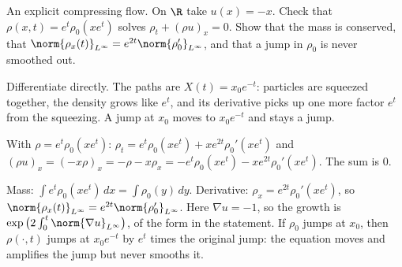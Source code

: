 \begin{exercise}
  An explicit compressing flow. On $\R$ take $u(x) = -x$. Check that $\rho(x,t) = e^t\rho_0(xe^t)$ solves $\rho_t + (\rho u)_x = 0$. Show that the mass is conserved, that $\norm{\rho_x(t)}_{L^\infty} = e^{2t}\norm{\rho_0'}_{L^\infty}$, and that a jump in $\rho_0$ is never smoothed out.
  \begin{hint}
    Differentiate directly. The paths are $X(t) = x_0e^{-t}$: particles are squeezed together, the density grows like $e^t$, and its derivative picks up one more factor $e^t$ from the squeezing. A jump at $x_0$ moves to $x_0e^{-t}$ and stays a jump.
  \end{hint}
  \begin{solution}
    With $\rho = e^t\rho_0(xe^t)$: $\rho_t = e^t\rho_0(xe^t) + xe^{2t}\rho_0'(xe^t)$ and $(\rho u)_x = (-x\rho)_x = -\rho - x\rho_x = -e^t\rho_0(xe^t) - xe^{2t}\rho_0'(xe^t)$. The sum is $0$.

    Mass: $\int e^t\rho_0(xe^t)\,dx = \int\rho_0(y)\,dy$. Derivative: $\rho_x = e^{2t}\rho_0'(xe^t)$, so $\norm{\rho_x(t)}_{L^\infty} = e^{2t}\norm{\rho_0'}_{L^\infty}$. Here $\nabla u = -1$, so the growth is $\exp\big(2\int_0^t\norm{\nabla u}_{L^\infty}\big)$, of the form in the statement. If $\rho_0$ jumps at $x_0$, then $\rho(\cdot,t)$ jumps at $x_0e^{-t}$ by $e^t$ times the original jump: the equation moves and amplifies the jump but never smooths it.
  \end{solution}
\end{exercise}

